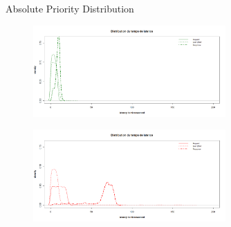 \documentclass[10 pt]{beamer}
\begin{document}
\begin{frame}{ Absolute Priority Distribution}
\begin{figure}[h!]

\includegraphics[height=3.5cm]{priomixtefa.png}
\label{fig:1}

\end{figure}

\begin{figure}[h!]

\includegraphics[height=3.5cm]{priomixtefo.png}
\label{fig:1}

\end{figure}
\end{frame}
\end{document}
